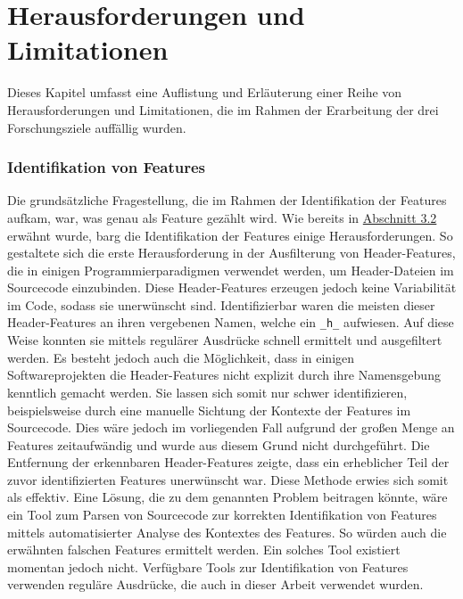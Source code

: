 
\chapter{Herausforderungen und Limitationen}
\label{challenges-list}

Dieses Kapitel umfasst eine Auflistung und Erläuterung einer Reihe von Herausforderungen und Limitationen, die im Rahmen der Erarbeitung der drei Forschungsziele auffällig wurden.

\subsection*{Identifikation von Features}

Die grundsätzliche Fragestellung, die im Rahmen der Identifikation der Features aufkam, war, was genau als Feature gezählt wird. Wie bereits in \hyperref[construction]{Abschnitt 3.2} erwähnt wurde, barg die Identifikation der Features einige Herausforderungen. So gestaltete sich die erste Herausforderung in der Ausfilterung von \glqq Header-Features\grqq{}, die in einigen Programmierparadigmen verwendet werden, um Header-Dateien im Sourcecode einzubinden. Diese Header-Features erzeugen jedoch keine Variabilität im Code, sodass sie unerwünscht sind. Identifizierbar waren die meisten dieser Header-Features an ihren vergebenen Namen, welche ein \texttt{\_h\_} aufwiesen. Auf diese Weise konnten sie mittels regulärer Ausdrücke schnell ermittelt und ausgefiltert werden. Es besteht jedoch auch die Möglichkeit, dass in einigen Softwareprojekten die Header-Features nicht explizit durch ihre Namensgebung kenntlich gemacht werden. Sie lassen sich somit nur schwer identifizieren, beispielsweise durch eine manuelle Sichtung der Kontexte der Features im Sourcecode. Dies wäre jedoch im vorliegenden Fall aufgrund der großen Menge an Features zeitaufwändig und wurde aus diesem Grund nicht durchgeführt. Die Entfernung der erkennbaren Header-Features zeigte, dass ein erheblicher Teil der zuvor identifizierten Features unerwünscht war. Diese Methode erwies sich somit als effektiv.
Eine Lösung, die zu dem genannten Problem beitragen könnte, wäre ein Tool zum Parsen von Sourcecode zur korrekten Identifikation von Features mittels automatisierter Analyse des Kontextes des Features. So würden auch die erwähnten \glqq falschen\grqq{} Features ermittelt werden. Ein solches Tool existiert momentan jedoch nicht. Verfügbare Tools zur Identifikation von Features verwenden reguläre Ausdrücke, die auch in dieser Arbeit verwendet wurden.

